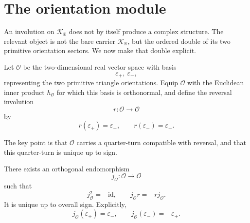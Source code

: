 \section{The orientation module}
\label{sec:hilbert-orientation-module}
An involution on \(\mathcal K_{\mathbb R}\) does not by itself produce a
complex structure.
The relevant object is not the bare carrier
\(\mathcal K_{\mathbb R}\), but the ordered double of its two primitive
orientation sectors.
We now make that double explicit.
\begin{definition}
	\label{def:orientation-module}
	Let \(\mathcal O\) be the two-dimensional real vector space with basis
	\[
		\varepsilon_{+},\ \varepsilon_{-},
	\]
	representing the two primitive triangle orientations.
	Equip \(\mathcal O\) with the Euclidean inner product
	\(h_{\mathcal O}\) for which this basis is orthonormal, and define the
	reversal involution
	\[
		r:\mathcal O\to\mathcal O
	\]
	by
	\[
		r(\varepsilon_{+})=\varepsilon_{-},
		\qquad
		r(\varepsilon_{-})=\varepsilon_{+}.
	\]
\end{definition}
The key point is that \(\mathcal O\) carries a quarter-turn compatible
with reversal, and that this quarter-turn is unique up to sign.
\begin{proposition}
	\label{prop:orientation-quarter-turn}
	There exists an orthogonal endomorphism
	\[
		j_{\mathcal O}:\mathcal O\to\mathcal O
	\]
	such that
	\[
		j_{\mathcal O}^{2}=-\mathrm{id},
		\qquad
		j_{\mathcal O}r=-rj_{\mathcal O}.
	\]
	It is unique up to overall sign.
	Explicitly,
	\[
		j_{\mathcal O}(\varepsilon_{+})=\varepsilon_{-},
		\qquad
		j_{\mathcal O}(\varepsilon_{-})=-\varepsilon_{+}.
	\]
\end{proposition}
